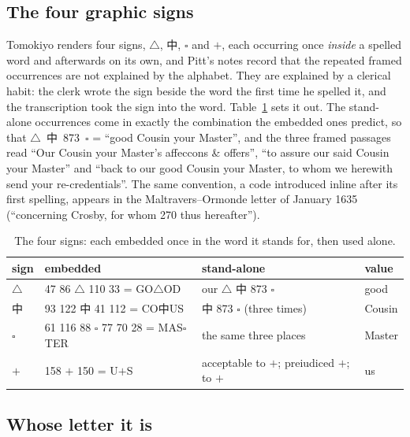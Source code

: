 \documentclass[11pt]{article}
\begin{document}
\subsection{The four graphic signs}

Tomokiyo renders four signs, $\triangle$, \textsf{中}, $\square$ and $+$, each occurring once \emph{inside} a spelled word and afterwards on its own, and Pitt's notes record that the repeated framed occurrences are not explained by the alphabet. They are explained by a clerical habit: the clerk wrote the sign beside the word the first time he spelled it, and the transcription took the sign into the word. Table~\ref{tab:signs} sets it out. The stand-alone occurrences come in exactly the combination the embedded ones predict, so that $\triangle$~\textsf{中}~873~$\square$ = ``good Cousin your Master'', and the three framed passages read ``Our Cousin your Master's affeccons \& offers'', ``to assure our said Cousin your Master'' and ``back to our good Cousin your Master, to whom we herewith send your re-credentials''. The same convention, a code introduced inline after its first spelling, appears in the Maltravers--Ormonde letter of January 1635 (``concerning Crosby, for whom 270 thus hereafter'').

\begin{table}[t]
\centering\small
\begin{tabular}{@{}llll@{}}
\toprule
sign & embedded & stand-alone & value \\
\midrule
$\triangle$ & 47 86 $\triangle$ 110 33 = GO$\triangle$OD & our $\triangle$ 中 873 $\square$ & good \\
中 & 93 122 中 41 112 = CO中US & 中 873 $\square$ (three times) & Cousin \\
$\square$ & 61 116 88 $\square$ 77 70 28 = MAS$\square$TER & the same three places & Master \\
$+$ & 158 $+$ 150 = U$+$S & acceptable to $+$; preiudiced $+$; to $+$ & us \\
\bottomrule
\end{tabular}
\caption{\label{tab:signs} The four signs: each embedded once in the word it stands for, then used alone.}
\end{table}

\subsection{Whose letter it is}
\end{document}
